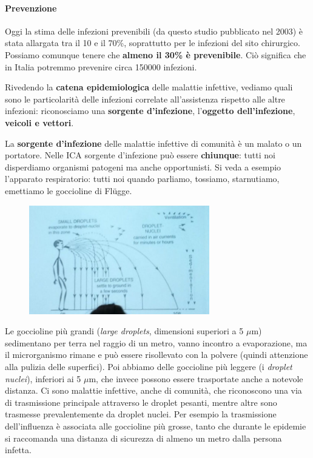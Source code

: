 \paragraph{Prevenzione}

Oggi la stima delle infezioni prevenibili (da questo studio pubblicato
nel 2003) è stata allargata tra il 10 e il 70\%, soprattutto per le
infezioni del sito chirurgico. Possiamo comunque tenere che
\textbf{almeno il 30\% è prevenibile}. Ciò significa che in Italia
potremmo prevenire circa 150000 infezioni.

Rivedendo la \textbf{catena epidemiologica} delle malattie infettive,
vediamo quali sono le particolarità delle infezioni correlate
all'assistenza rispetto alle altre infezioni: riconosciamo una
\textbf{sorgente d'infezione}, l'\textbf{oggetto dell'infezione},
\textbf{veicoli e vettori}.

La \textbf{sorgente d'infezione} delle malattie infettive di comunità è
un malato o un portatore. Nelle ICA sorgente d'infezione può essere
\textbf{chiunque}: tutti noi disperdiamo organismi patogeni ma anche
opportunisti. Si veda a esempio l'apparato respiratorio: tutti noi
quando parliamo, tossiamo, starnutiamo, emettiamo le goccioline di
Flügge.

\begin{figure}[!ht]
\centering
	\includegraphics[width=0.7\textwidth]{19/image2.jpeg}
	\end{figure}

Le goccioline più grandi (\emph{large droplets}, dimensioni superiori a 
5 $\mu$m) sedimentano per terra nel raggio di un metro, vanno incontro a 
evaporazione, ma il microrganismo rimane e può essere risollevato con la 
polvere (quindi attenzione alla pulizia delle superfici). Poi abbiamo delle 
goccioline più leggere (i \emph{droplet nuclei}), inferiori ai 5 $\mu$m, 
che invece possono essere trasportate anche a notevole distanza. Ci sono 
malattie infettive, anche di comunità, che riconoscono una via di
trasmissione principale attraverso le droplet pesanti, mentre altre sono
trasmesse prevalentemente da droplet nuclei. Per esempio la trasmissione
dell'influenza è associata alle goccioline più grosse, tanto che durante
le epidemie si raccomanda una distanza di sicurezza di almeno un metro
dalla persona infetta.

